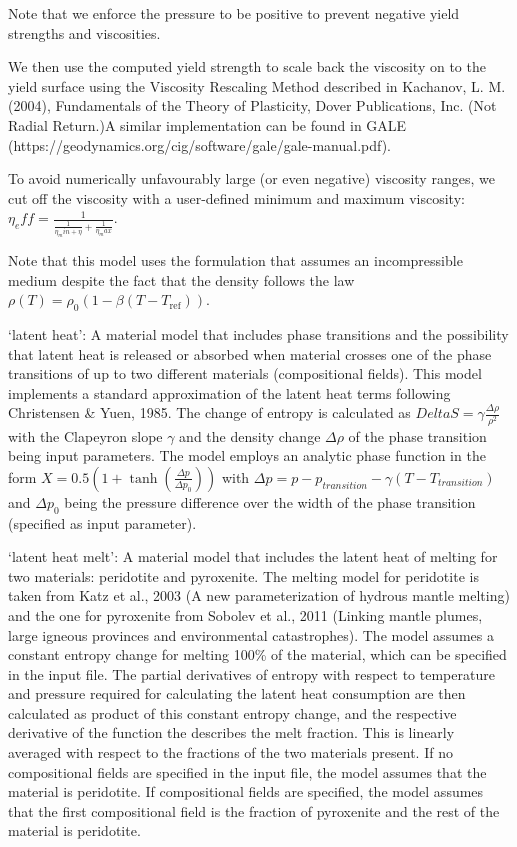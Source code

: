 \begin{itemize}
Note that we enforce the pressure to be positive to prevent negative yield strengths and viscosities. 

We then use the computed yield strength to scale back the viscosity on to the yield surface using the Viscosity Rescaling Method described in Kachanov, L. M. (2004), Fundamentals of the Theory of Plasticity, Dover Publications, Inc. (Not Radial Return.)A similar implementation can be found in GALE (https://geodynamics.org/cig/software/gale/gale-manual.pdf). 

To avoid numerically unfavourably large (or even negative) viscosity ranges, we cut off the viscosity with a user-defined minimum and maximum viscosity: $\eta_eff = \frac{1}{\frac{1}{\eta_min + \eta}+ \frac{1}{\eta_max}}$. 

Note that this model uses the formulation that assumes an incompressible medium despite the fact that the density follows the law $\rho(T)=\rho_0(1-\beta(T-T_{\text{ref}}))$. 

`latent heat': A material model that includes phase transitions and the possibility that latent heat is released or absorbed when material crosses one of the phase transitions of up to two different materials (compositional fields). This model implements a standard approximation of the latent heat terms following Christensen \& Yuen, 1985. The change of entropy is calculated as $Delta S = \gamma \frac{\Delta\rho}{\rho^2}$ with the Clapeyron slope $\gamma$ and the density change $\Delta\rho$ of the phase transition being input parameters. The model employs an analytic phase function in the form $X=0.5 \left( 1 + \tanh \left( \frac{\Delta p}{\Delta p_0} \right) \right)$ with $\Delta p = p - p_{transition} - \gamma \left( T - T_{transition} \right)$ and $\Delta p_0$ being the pressure difference over the width of the phase transition (specified as input parameter).

`latent heat melt': A material model that includes the latent heat of melting for two materials: peridotite and pyroxenite. The melting model for peridotite is taken from Katz et al., 2003 (A new parameterization of hydrous mantle melting) and the one for pyroxenite from Sobolev et al., 2011 (Linking mantle plumes, large igneous provinces and environmental catastrophes). The model assumes a constant entropy change for melting 100\% of the material, which can be specified in the input file. The partial derivatives of entropy with respect to temperature and pressure required for calculating the latent heat consumption are then calculated as product of this constant entropy change, and the respective derivative of the function the describes the melt fraction. This is linearly averaged with respect to the fractions of the two materials present. If no compositional fields are specified in the input file, the model assumes that the material is peridotite. If compositional fields are specified, the model assumes that the first compositional field is the fraction of pyroxenite and the rest of the material is peridotite. 


\end{itemize}
